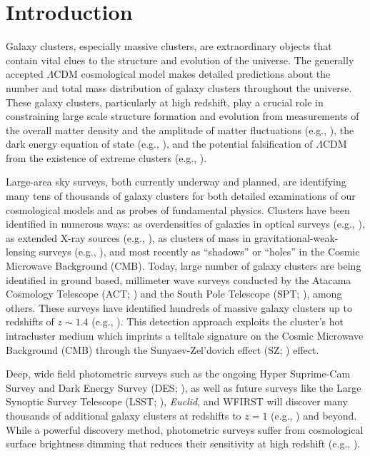 \documentclass[apj, revtex4-1]{emulateapj}
\newcommand{\eg}{e.g.}
\newcommand{\citeeg}[1]{(\eg, \citealt{#1})}
\begin{document}
\section{Introduction}\label{sec:intro}
Galaxy clusters, especially massive clusters, are extraordinary objects that contain vital clues to the structure and evolution of the universe. The generally accepted $\Lambda$CDM cosmological model makes detailed predictions about the number and total mass distribution of galaxy clusters throughout the universe. These galaxy clusters, particularly at high redshift, play a crucial role in constraining large scale structure formation and evolution from measurements of the overall matter density and the amplitude of matter fluctuations \citeeg{Evrard1989,Henry1991,Borgani2001,White1993,White1993b,Eke1996,Donahue1998}, the dark energy equation of state \citeeg{Henry2004,Mantz2008,Vikhlinin2009a}, and the potential falsification of $\Lambda$CDM from the existence of extreme clusters \citeeg{Mortonson2011, Harrison2012, Harrison2013, Waizmann2013}.

Large-area sky surveys, both currently underway and planned, are identifying many tens of thousands of galaxy clusters for both detailed examinations of our cosmological models and as probes of fundamental physics. Clusters have been identified in numerous ways: as overdensities of galaxies in optical surveys \citeeg{Abell1958,Postman1996}, as extended X-ray sources \citeeg{Gioia1990,Ebeling1998,Boehringer2000}, as clusters of mass in gravitational-weak-lensing surveys \citeeg{Wittman2006}, and most recently as ``shadows'' or ``holes'' in the Cosmic Microwave Background (CMB).  Today, large number of galaxy clusters are being identified in ground based, millimeter wave surveys conducted by the Atacama Cosmology Telescope (ACT; \citealt{Swetz2011}) and the South Pole Telescope (SPT; \citealt{Carlstrom2011}), among others. These surveys have identified hundreds of massive galaxy clusters up to redshifts of $z \sim 1.4$ \citeeg{Vanderlinde2010, Menanteau2010, Marriage2011, Hasselfield2013a, Bleem2015, Hilton2018}. This detection approach exploits the cluster's hot intracluster medium which imprints a telltale signature on the Cosmic Microwave Background (CMB) through the Sunyaev-Zel'dovich effect (SZ; \citealt{Sunyaev1972}) effect.

Deep, wide field photometric surveys such as the ongoing Hyper Suprime-Cam Survey \citep{Aihara2018a} and Dark Energy Survey (DES; \citealt{DES2005}), as well as future surveys like the Large Synoptic Survey Telescope (LSST; \citealt{LSST2012}), \textit{Euclid}, and WFIRST will discover many thousands of additional galaxy clusters at redshifts to $z=1$ \citeeg{DarkEnergySurveyCollaboration2016} and beyond. While a powerful discovery method, photometric surveys suffer from cosmological surface brightness dimming that reduces their sensitivity at high redshift \citeeg{Calvi2014}.
\end{document}
